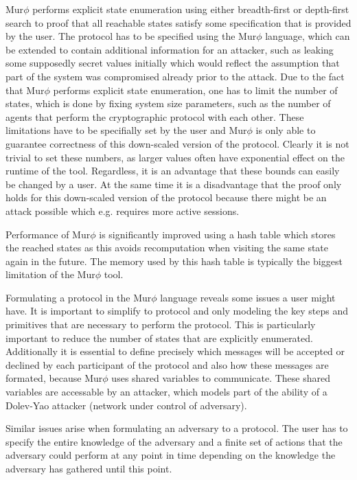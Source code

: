 \documentclass[a4paper,UKenglish]{lipics-v2018}
\def\murphi{Mur$\phi$ }
\begin{document}
\murphi performs explicit state enumeration using either breadth-first or depth-first search to proof that all reachable states satisfy some specification that is provided by the user. The protocol has to be specified using the \murphi language, which can be extended to contain additional information for an attacker, such as leaking some supposedly secret values initially which would reflect the assumption that part of the system was compromised already prior to the attack. Due to the fact that \murphi performs explicit state enumeration, one has to limit the number of states, which is done by fixing system size parameters, such as the number of agents that perform the cryptographic protocol with each other. These limitations have to be specifially set by the user and \murphi is only able to guarantee correctness of this down-scaled version of the protocol. Clearly it is not trivial to set these numbers, as larger values often have exponential effect on the runtime of the tool.\cite{murphi} Regardless, it is an advantage that these bounds can easily be changed by a user. At the same time it is a disadvantage that the proof only holds for this down-scaled version of the protocol because there might be an attack possible which e.g. requires more active sessions.

Performance of \murphi is significantly improved using a hash table which stores the reached states as this avoids recomputation when visiting the same state again in the future. The memory used by this hash table is typically the biggest limitation of the \murphi tool.\cite{murphi}

Formulating a protocol in the \murphi language reveals some issues a user might have. It is important to simplify to protocol and only modeling the key steps and primitives that are necessary to perform the protocol. This is particularly important to reduce the number of states that are explicitly enumerated. Additionally it is essential to define precisely which messages will be accepted or declined by each participant of the protocol and also how these messages are formated, because \murphi uses shared variables to communicate. These shared variables are accessable by an attacker, which models part of the ability of a Dolev-Yao attacker (network under control of adversary).\cite{murphi}

Similar issues arise when formulating an adversary to a protocol. The user has to specify the entire knowledge of the adversary and a finite set of actions that the adversary could perform at any point in time depending on the knowledge the adversary has gathered until this point.\cite{murphi}
\end{document}
